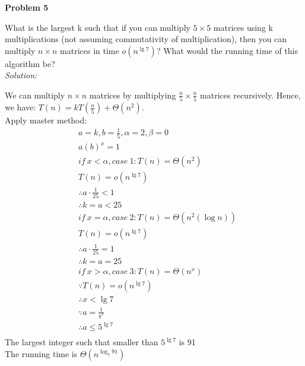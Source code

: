 \documentclass[12pt,letterpaper]{article}
\def\pp{\par\noindent}
\newcommand{\problem}[1]{ \bigskip \pp \textbf{Problem #1}\par}
\newcommand{\solution}{\textit{Solution:}\par}
\begin{document}
\problem{5}
What is the largest k such that if you can multiply $5 \times 5$ matrices using k multiplications (not assuming commutativity of multiplication), then you can multiply $ n \times n$ matrices in time $o(n^{\lg 7})$? What would the running time of this algorithm be? \\
\solution
We can multiply $n \times n$ matrices by multiplying $\frac{n}{5} \times \frac{n}{5}$ matrices recursively. Hence, we have: $T(n) = k T(\frac{n}{5}) + \Theta(n^2)$. \\
Apply master method: \\
\begin{align*}
& a = k, b = \frac{1}{5}, \alpha = 2, \beta = 0 \\
& a (b)^x = 1 \\
& if\  x < \alpha, case\ 1: T(n) = \Theta(n^2) \\
& T(n) = o(n^{\lg 7}) \\
& \therefore a \cdot \frac{1}{25} < 1 \\
& \therefore k = a < 25 \\
& if\  x = \alpha, case\ 2: T(n) = \Theta(n^2 (\log n)) \\
& T(n) = o(n^{\lg 7}) \\
& \therefore a \cdot \frac{1}{25} = 1 \\
& \therefore k = a = 25 \\
& if\  x > \alpha, case\ 3: T(n) = \Theta(n^x) \\
& \because T(n) = o(n^{\lg 7}) \\
& \therefore x < \lg 7 \\
& \because a = \frac{1}{b^x} \\
& \therefore a \le 5^{\lg 7} \\
\end{align*}
The largest integer such that smaller than $ 5^{\lg 7} $ is 91 \\
The running time is $\Theta(n^{\log_5 91})$ \\
\end{document}
